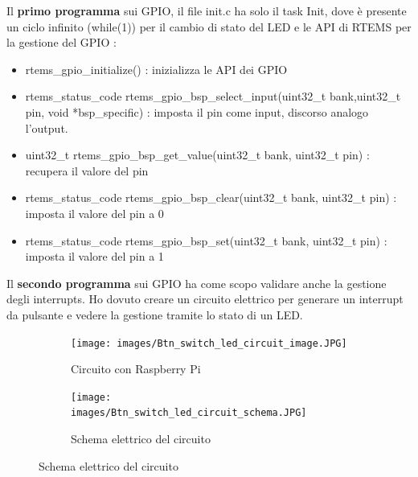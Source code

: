 \documentclass[12pt, a4paper, titlepage, oneside]{book}
\begin{document}
\begin{flushleft}
Il \textbf{primo programma} sui GPIO, il file init.c ha solo il task Init, dove è presente un ciclo infinito (while(1)) per il cambio di stato del LED e le API di RTEMS per la gestione del GPIO :
\begin{itemize}
    \item rtems\_gpio\_initialize() : inizializza le API dei GPIO
    \item rtems\_status\_code rtems\_gpio\_bsp\_select\_input(uint32\_t bank,uint32\_t pin,  void *bsp\_specific) : imposta il pin come input, discorso analogo l'output.
    \item uint32\_t rtems\_gpio\_bsp\_get\_value(uint32\_t bank, uint32\_t pin) : recupera il valore del pin
    \item rtems\_status\_code rtems\_gpio\_bsp\_clear(uint32\_t bank, uint32\_t pin) : imposta il valore del pin a 0
    \item rtems\_status\_code rtems\_gpio\_bsp\_set(uint32\_t bank, uint32\_t pin) : imposta il valore del pin a 1
\end{itemize}
\newpage
Il \textbf{secondo programma} sui GPIO ha come scopo validare anche la gestione degli interrupts. 
Ho dovuto creare un circuito elettrico per generare un interrupt da pulsante e vedere la gestione tramite lo stato di un LED.\\
\begin{figure}[h]
\begin{subfigure}{0.5\textwidth}
\texttt{[image: images/Btn\_switch\_led\_circuit\_image.JPG]}
\caption{Circuito con Raspberry Pi}
\label{fig:Circuito con Raspberry Pi}
\end{subfigure}
\begin{subfigure}{0.5\textwidth}
\texttt{[image: images/Btn\_switch\_led\_circuit\_schema.JPG]}
\caption{Schema elettrico del circuito}
\label{fig:Schema elettrico del circuito}
\end{subfigure}
\end{figure}


\end{flushleft}
\end{document}

